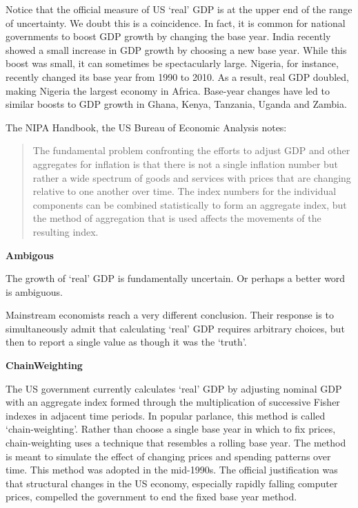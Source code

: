 \documentclass[
]{book}
\begin{document}
Notice that the official measure of US `real' GDP is at the upper end of the range of uncertainty. We doubt this is a coincidence. In fact, it is common for national governments to boost GDP growth by changing the base year. India recently showed a small increase in GDP growth by choosing a new base year. While this boost was small, it can sometimes be spectacularly large. Nigeria, for instance, recently changed its base year from 1990 to 2010. As a result, real GDP doubled, making Nigeria the largest economy in Africa. Base-year changes have led to similar boosts to GDP growth in Ghana, Kenya, Tanzania, Uganda and Zambia.

The NIPA Handbook, the US Bureau of Economic Analysis notes:

\begin{quote}
The fundamental problem confronting the efforts to adjust GDP and other aggregates for inflation is that there is not a single inflation number but rather a wide spectrum of goods and services with prices that are changing relative to one another over time. The index numbers for the individual components can be combined statistically to form an aggregate index, but the method of aggregation that is used affects the movements of the resulting index.
\end{quote}

\textbf{Ambigous}

The growth of `real' GDP is fundamentally uncertain. Or perhaps a better word is ambiguous.

Mainstream economists reach a very different conclusion. Their response is to simultaneously admit that calculating `real' GDP requires arbitrary choices, but then to report a single value as though it was the `truth'.

\textbf{ChainWeighting}

The US government currently calculates `real' GDP by adjusting nominal GDP with an aggregate index formed through the multiplication of successive Fisher indexes in adjacent time periods. In popular parlance, this method is called `chain-weighting'. Rather than choose a single base year in which to fix prices, chain-weighting uses a technique that resembles a rolling base year. The method is meant to simulate the effect of changing prices and spending patterns over time.
This method was adopted in the mid-1990s. The official justification was that structural changes in the US economy, especially rapidly falling computer prices, compelled the government to end the fixed base year method.
\end{document}
